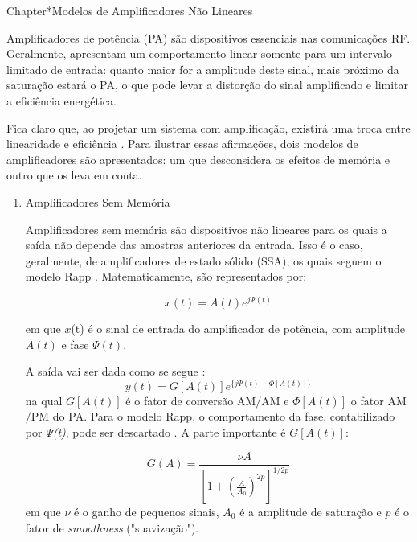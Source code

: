 Chapter*{Modelos de Amplificadores Não Lineares} \label{apendix II}

\par Amplificadores de potência (PA) são dispositivos essenciais nas comunicações RF. Geralmente, apresentam um comportamento linear somente para um intervalo limitado de entrada: quanto maior for a amplitude deste sinal, mais próximo da saturação estará o PA, o que pode levar a distorção do sinal amplificado e limitar a eficiência energética. 
\par Fica claro que, ao projetar um sistema com amplificação, existirá uma troca entre linearidade e eficiência \cite{Bhat}. Para ilustrar essas afirmações, dois modelos de amplificadores são apresentados: um que desconsidera os efeitos de memória e outro que os leva em conta. 
 
\begin{enumerate} 
\item {Amplificadores Sem Memória} 

Amplificadores sem memória são dispositivos não lineares para os quais a saída não depende das amostras anteriores da entrada. Isso é o caso, geralmente, de amplificadores de estado sólido (SSA), os quais seguem o modelo Rapp \cite{Rapp}. Matematicamente, são representados por: 

\begin{equation} \label{x}
x(t) = A(t)e^{j\Psi(t)}
\end{equation}

em que $x$(t) é o sinal de entrada do amplificador de potência, com amplitude $A(t)$ e fase $\Psi(t)$. 

\par A saída vai ser dada como se segue \cite{Uilian2}:
\begin{equation} \label{y}
y(t) = G[A(t)] e^{\{j\Psi(t)+ \Phi[A(t)]\}} 
\end{equation}
na qual $G[A(t)]$ é o fator de conversão AM$/$AM e $\Phi[A(t)]$ o fator AM$/$PM do PA. Para o modelo Rapp, o comportamento da fase, contabilizado por \textit{$\Psi$(t)}, pode ser descartado \cite{Uilian2}. A parte importante é $G[A(t)]$: 

\begin{equation} 
\label{GA}
G(A)= \frac{\nu A}{\left[1+ \left(\frac{A}{A_0} \right)^{2p} \right]^{1/2p}} 
\end{equation}
em que $\nu$ é o ganho de pequenos sinais, $A_0$ é a amplitude de saturação e $p$ é o fator de \textit{smoothness} ("suavização"). 


\end{enumerate}
